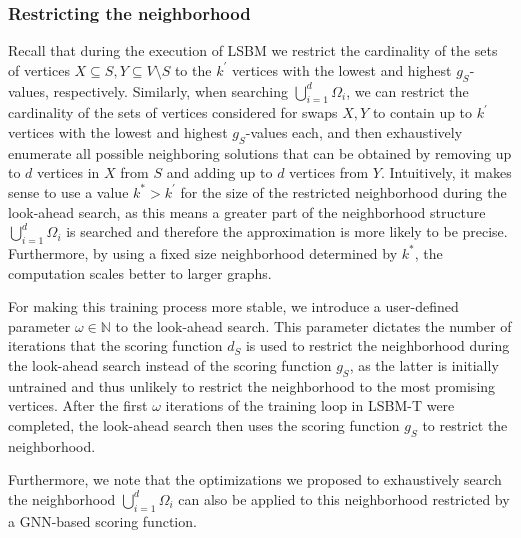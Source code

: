 \documentclass[draft,final]{vutinfth} %
\begin{document}
\subsubsection{Restricting the neighborhood}

Recall that during the execution of LSBM we restrict the cardinality of the sets of vertices $X \subseteq S, Y \subseteq V \setminus S$ to the $k^\prime$ vertices with the lowest and highest $g_S$-values, respectively. Similarly, when searching $\bigcup_{i=1}^d \Omega_i$, we can restrict the cardinality of the sets of vertices considered for swaps $X, Y$ to contain up to $k^\prime$ vertices with the lowest and highest $g_S$-values each, and then exhaustively enumerate all possible neighboring solutions that can be obtained by removing up to $d$ vertices in $X$ from $S$ and adding up to $d$ vertices from $Y$. Intuitively, it makes sense to use a value $k^* > k^\prime$ for the size of the restricted neighborhood during the look-ahead search, as this means a greater part of the neighborhood structure $\bigcup_{i=1}^d \Omega_i$ is searched and therefore the approximation is more likely to be precise. 
Furthermore, by using a fixed size neighborhood determined by $k^*$, the computation scales better to larger graphs. 

For making this training process more stable, we introduce a user-defined parameter $\omega \in \mathbb{N}$ to the look-ahead search. This parameter dictates the number of iterations that the scoring function $d_S$ is used to restrict the neighborhood during the look-ahead search instead of the scoring function $g_S$, as the latter is initially untrained and thus unlikely to restrict the neighborhood to the most promising vertices. After the first $\omega$ iterations of the training loop in LSBM-T were completed, the look-ahead search then uses the scoring function $g_S$ to restrict the neighborhood. 

Furthermore, we note that the optimizations we proposed to exhaustively search the neighborhood $\bigcup_{i=1}^d \Omega_i$ can also be applied to this neighborhood restricted by a GNN-based scoring function. 
\end{document}
